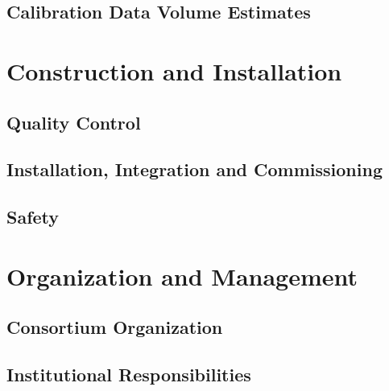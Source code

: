 \subsection{Calibration Data Volume Estimates}
\label{sec:sp-calib-daqreq}



\section{Construction and Installation}
\label{sec:sp-calib-const}

\subsection{Quality Control}
\label{sec:sp-calib-qc}


\subsection{Installation, Integration and Commissioning}
\label{sec:sp-calib-iic}


\subsection{Safety}
\label{sec:sp-calib-safe}




\section{Organization and Management}
\label{sec:sp-calib-org-manag}
\subsection{Consortium Organization}
\label{sec:sp-calib-org}


\subsection{Institutional Responsibilities}
\label{sec:sp-calib-resp}


